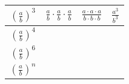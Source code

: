\begin{center}
\begin{tabular}{|c|c|c|c|}
	\hline
	 $\left(\frac{a}{b}\right)^3$ &\hspace{2cm} $ \frac{a}{b} \cdot \frac{a}{b} \cdot \frac{a}{b}$\hspace{2cm} & \hspace{1cm} $\frac{a\cdot a\cdot a}{b\cdot b\cdot b}$ \hspace{1cm} & $\frac{a^3}{b^3}$\\
	\hline
	$\left(\frac{a}{b}\right)^4$ & & &\\
	\hline
	$\left(\frac{a}{b}\right)^6$ & & &\\
	\hline
	$\left(\frac{a}{b}\right)^n$ &  & &\\
	\cline{1-1} 
	\cline{4-4}
\end{tabular}




\end{center}

\egroup